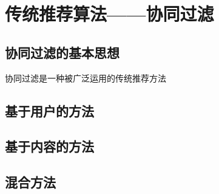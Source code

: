 \section{传统推荐算法——协同过滤}
\subsection{协同过滤的基本思想}
协同过滤是一种被广泛运用的传统推荐方法
\subsection{基于用户的方法}
\subsection{基于内容的方法}
\subsection{混合方法}



